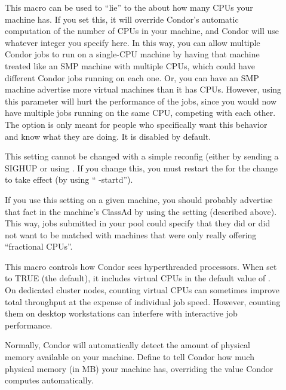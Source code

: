 \begin{description}
\item[] \label{param:NumCpus}
  This macro can be used to ``lie'' to the  about how many CPUs
  your machine has.
  If you set this, it will override Condor's automatic computation of
  the number of CPUs in your machine, and Condor will use whatever
  integer you specify here. 
  In this way, you can allow multiple Condor jobs to run on a
  single-CPU machine by having that machine treated like an SMP
  machine with multiple CPUs, which could have different Condor jobs
  running on each one.
  Or, you can have an SMP machine advertise more virtual machines than
  it has CPUs.
  However, using this parameter will hurt the performance of the jobs,
  since you would now have multiple jobs running on the same CPU,
  competing with each other.
  The option is only meant for people who specifically want this
  behavior and know what they are doing.  
  It is disabled by default.

  \Note This setting cannot be changed with a simple reconfig (either
  by sending a SIGHUP or using .
  If you change this, you must restart the  for the
  change to take effect (by using `` -startd'').

  \Note If you use this setting on a given machine, you should
  probably advertise that fact in the machine's ClassAd by using the
   setting (described above).
  This way, jobs submitted in your pool could specify that they did or
  did not want to be matched with machines that were only really
  offering ``fractional CPUs''.

\item[] \label{param:CountHyperthreadCpus}
  This macro controls how Condor sees hyperthreaded
  processors. When set to TRUE (the default), it includes virtual CPUs in
  the default value of . On dedicated cluster nodes, 
  counting virtual CPUs can sometimes improve total throughput at the expense 
  of individual job speed. However, counting them on desktop workstations can
  interfere with interactive job performance.

\item[] \label{param:Memory}
  Normally, Condor will automatically detect the amount of physical
  memory available on your machine.  Define  to tell
  Condor how much physical memory (in MB) your machine has, overriding
  the value Condor computes automatically.


\end{description}
